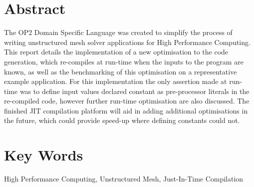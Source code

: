 
%
\vspace*{\fill}
\begin{adjustwidth}{60pt}{60pt}
\begin{center}
\section*{Abstract}
\normalsize
The OP2 Domain Specific Language was created to simplify the process of writing unstructured mesh solver applications for High Performance Computing. This report details the implementation of a new optimisation to the code generation, which re-compiles at run-time when the inputs to the program are known, as well as the benchmarking of this optimisation on a representative example application. For this implementation the only assertion made at run-time was to define input values declared constant as pre-processor literals in the re-compiled code, however further run-time optimisation are also discussed. The finished JIT compilation platform will aid in adding additional optimisations in the future, which could provide speed-up where defining constants could not.
\section*{Key Words}
High Performance Computing, Unstructured Mesh, Just-In-Time Compilation
\end{center}
\end{adjustwidth}
\vspace*{\fill}
